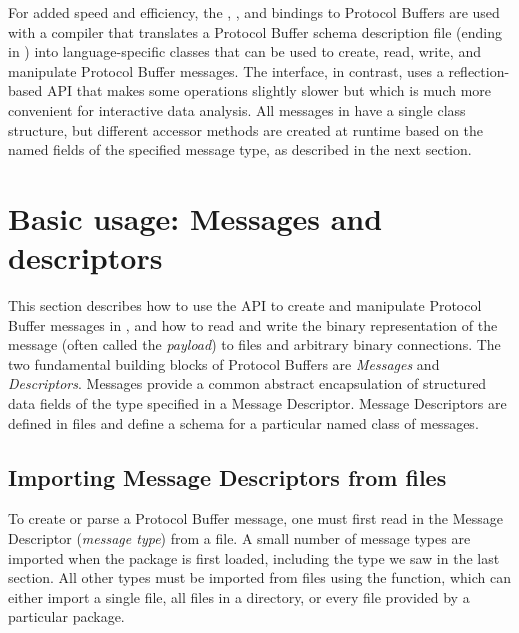 \documentclass[article]{jss}
\begin{document}
For added speed and efficiency, the , ,
and  bindings to
Protocol Buffers are used with a compiler that translates a Protocol
Buffer schema description file (ending in ) into
language-specific classes that can be used to create, read, write, and
manipulate Protocol Buffer messages.  The  interface, in contrast,
uses a reflection-based API that makes some operations slightly
slower but which is much more convenient for interactive data analysis.
All messages in  have a single class
structure, but different accessor methods are created at runtime based
on the named fields of the specified message type, as described in the
next section.

\section{Basic usage: Messages and descriptors}
\label{sec:rprotobuf-basic}

This section describes how to use the  API to create and manipulate
Protocol Buffer messages in , and how to read and write the
binary representation of the message (often called the \emph{payload}) to files and arbitrary binary
 connections.
The two fundamental building blocks of Protocol Buffers are \emph{Messages}
and \emph{Descriptors}.  Messages provide a common abstract encapsulation of
structured data fields of the type specified in a Message Descriptor.
Message Descriptors are defined in  files and define a
schema for a particular named class of messages.

\subsection[Importing Message Descriptors from .proto files]{Importing
  Message Descriptors from  files}

To create or parse a Protocol Buffer message, one must first read in
the Message Descriptor (\emph{message type}) from a  file.
A small number of message types are imported when the package is first
loaded, including the  type we saw in the last
section.
All other types must be imported from
 files using the 
function, which can either import a single file, all files in a directory,
or every  file provided by a particular  package.
\end{document}
